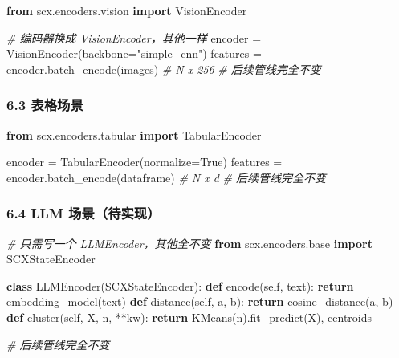 \documentclass[
  12pt,
]{ctexart}
\newenvironment{Shaded}{}{}
\newcommand{\CommentTok}[1]{\textcolor[rgb]{0.38,0.63,0.69}{\textit{#1}}}
\newcommand{\ControlFlowTok}[1]{\textcolor[rgb]{0.00,0.44,0.13}{\textbf{#1}}}
\newcommand{\ImportTok}[1]{\textcolor[rgb]{0.00,0.50,0.00}{\textbf{#1}}}
\newcommand{\KeywordTok}[1]{\textcolor[rgb]{0.00,0.44,0.13}{\textbf{#1}}}
\newcommand{\NormalTok}[1]{#1}
\newcommand{\OperatorTok}[1]{\textcolor[rgb]{0.40,0.40,0.40}{#1}}
\newcommand{\StringTok}[1]{\textcolor[rgb]{0.25,0.44,0.63}{#1}}
\newcommand{\VariableTok}[1]{\textcolor[rgb]{0.10,0.09,0.49}{#1}}
\begin{document}
\begin{Shaded}
\begin{Highlighting}[]
\ImportTok{from}\NormalTok{ scx.encoders.vision }\ImportTok{import}\NormalTok{ VisionEncoder}

\CommentTok{\# 编码器换成 VisionEncoder，其他一样}
\NormalTok{encoder }\OperatorTok{=}\NormalTok{ VisionEncoder(backbone}\OperatorTok{=}\StringTok{"simple\_cnn"}\NormalTok{)}
\NormalTok{features }\OperatorTok{=}\NormalTok{ encoder.batch\_encode(images)  }\CommentTok{\# N x 256}
\CommentTok{\# 后续管线完全不变}
\end{Highlighting}
\end{Shaded}

\subsubsection{6.3 表格场景}\label{ux8868ux683cux573aux666f}

\begin{Shaded}
\begin{Highlighting}[]
\ImportTok{from}\NormalTok{ scx.encoders.tabular }\ImportTok{import}\NormalTok{ TabularEncoder}

\NormalTok{encoder }\OperatorTok{=}\NormalTok{ TabularEncoder(normalize}\OperatorTok{=}\VariableTok{True}\NormalTok{)}
\NormalTok{features }\OperatorTok{=}\NormalTok{ encoder.batch\_encode(dataframe)  }\CommentTok{\# N x d}
\CommentTok{\# 后续管线完全不变}
\end{Highlighting}
\end{Shaded}

\subsubsection{6.4 LLM
场景（待实现）}\label{llm-ux573aux666fux5f85ux5b9eux73b0}

\begin{Shaded}
\begin{Highlighting}[]
\CommentTok{\# 只需写一个 LLMEncoder，其他全不变}
\ImportTok{from}\NormalTok{ scx.encoders.base }\ImportTok{import}\NormalTok{ SCXStateEncoder}

\KeywordTok{class}\NormalTok{ LLMEncoder(SCXStateEncoder):}
    \KeywordTok{def}\NormalTok{ encode(}\VariableTok{self}\NormalTok{, text): }\ControlFlowTok{return}\NormalTok{ embedding\_model(text)}
    \KeywordTok{def}\NormalTok{ distance(}\VariableTok{self}\NormalTok{, a, b): }\ControlFlowTok{return}\NormalTok{ cosine\_distance(a, b)}
    \KeywordTok{def}\NormalTok{ cluster(}\VariableTok{self}\NormalTok{, X, n, }\OperatorTok{**}\NormalTok{kw): }\ControlFlowTok{return}\NormalTok{ KMeans(n).fit\_predict(X), centroids}

\CommentTok{\# 后续管线完全不变}
\end{Highlighting}
\end{Shaded}
\end{document}
